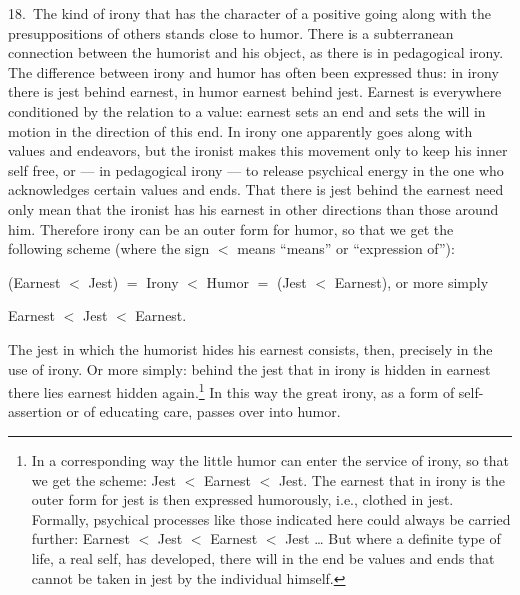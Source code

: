 \documentclass[12pt]{book}
\newcommand{\opage}[1]{\marginnote{\footnotesize\textit{[#1]}}}
\begin{document}
18.~The kind of irony that has the character of a positive going along with the
presuppositions of others stands close to humor. There is a subterranean connection
between the humorist and his object, as there is in pedagogical irony. The difference
between irony and humor has often been expressed thus: in irony there is jest behind
earnest, in humor earnest behind jest. Earnest is everywhere conditioned by the
relation to a value: earnest sets an end and sets the will in motion in the direction
of this end. In irony one apparently \opage{69}goes along with values and endeavors,
but the ironist makes this movement only to keep his inner self free, or --- in
pedagogical irony --- to release psychical energy in the one who acknowledges certain
values and ends. That there is jest behind the earnest need only mean that the
ironist has his earnest in other directions than those around him. Therefore irony
can be an outer form for humor, so that we get the following scheme (where the sign
$<$ means ``means'' or ``expression of''):

(Earnest $<$ Jest) $=$ Irony $<$ Humor $=$ (Jest $<$ Earnest), or more simply

\begin{center}Earnest $<$ Jest $<$ Earnest.\end{center}

The jest in which the humorist hides his earnest consists, then, precisely in the use
of irony. Or more simply: behind the jest that in irony is hidden in earnest there
lies earnest hidden again.\footnote{In a corresponding way the little humor can
enter the service of irony, so that we get the scheme: Jest $<$ Earnest $<$ Jest. The
earnest that in irony is the outer form for jest is then expressed humorously, i.e.,
clothed in jest. Formally, psychical processes like those indicated here could
always be carried further: Earnest $<$ Jest $<$ Earnest $<$ Jest \dots{} But where a
definite type of life, a real self, has developed, there will in the end be values
and ends that cannot be taken in jest by the individual himself.} In this way the
great irony, as a form of self-assertion or of educating care, passes over into
humor.
\end{document}
